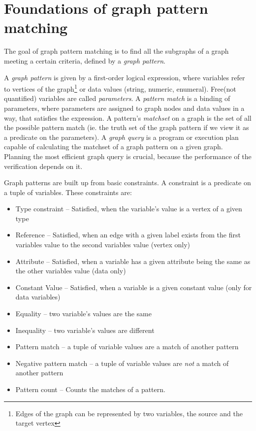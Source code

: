 \section{Foundations of graph pattern matching}
\label{section:gpmc}


The goal of graph pattern matching is to find all the subgraphs of a graph meeting a certain criteria, defined by a \emph{graph pattern}.

A \emph{graph pattern} is given by a first-order logical expression, where variables refer to vertices of the graph\footnote{Edges of the graph can be represented by two variables, the source and the target vertex} or data values (string, numeric, enumeral).
Free(not quantified) variables are called \emph{parameters}.  
A \emph{pattern match} is a binding of parameters, where parameters are assigned to graph nodes and data values in a way, that satisfies the expression.
A pattern's \emph{matchset} on a graph is the set of all the possible pattern match (ie. the truth set of the graph pattern if we view it as a predicate on the parameters).
A \emph{graph query} is a program or execution plan capable of calculating the matchset of a graph pattern on a given graph. 
Planning the most efficient graph query is crucial, because the performance of the verification depends on it.

Graph patterns are built up from basic constraints. 
A constraint is a predicate on a tuple of variables. 
These constraints are: 

\begin{itemize}
	\item Type constraint -- Satisfied, when the variable's value is a vertex of a given type
	\item Reference -- Satisfied, when an edge with a given label exists from the first variables value to the second variables value (vertex only)
	\item Attribute -- Satisfied, when a variable has a given attribute being the same as the other variables value (data only)
	\item Constant Value -- Satisfied, when a variable is a given constant value (only for data variables)
	\item Equality -- two variable's values are the same
	\item Inequality -- two variable's values are different
	\item Pattern match -- a tuple of variable values are a match of another pattern	
	\item Negative pattern match -- a tuple of variable values are \emph{not} a match of another pattern
	\item Pattern count -- Counts the matches of a pattern.
\end{itemize}


